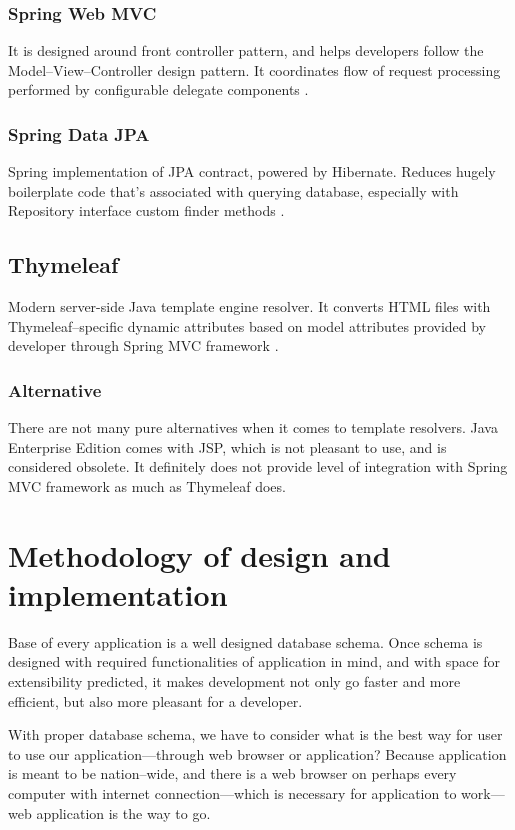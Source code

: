 \documentclass[a4paper,twoside,12pt]{book}
\begin{document}
      \subsubsection{Spring Web MVC}
        It is designed around front controller pattern, and helps developers follow the Model--View--Controller design pattern.
        It coordinates flow of request processing performed by configurable delegate components \cite{bib:spring_web_mvc}.
      
      \subsubsection{Spring Data JPA}
        Spring implementation of JPA contract, powered by Hibernate. Reduces hugely boilerplate code that's associated with querying database,
        especially with Repository interface custom finder methods \cite{bib:spring_data_jpa}.

    \subsection{Thymeleaf}
      Modern server-side Java template engine resolver. 
      It converts HTML files with Thymeleaf--specific dynamic attributes based on model attributes provided by developer through Spring MVC framework \cite{bib:thymeleaf}.
      
      \subsubsection{Alternative}
        There are not many pure alternatives when it comes to template resolvers. 
        Java Enterprise Edition comes with JSP, which is not pleasant to use, and is considered obsolete.
        It definitely does not provide level of integration with Spring MVC framework as much as Thymeleaf does.

  \section{Methodology of design and implementation}
    Base of every application is a well designed database schema. 
    Once schema is designed with required functionalities of application in mind, and with space for extensibility predicted,
    it makes development not only go faster and more efficient, but also more pleasant for a developer.

    With proper database schema, we have to consider what is the best way for user to use our application---through web browser or application?
    Because application is meant to be nation--wide, 
    and there is a web browser on perhaps every computer with internet connection---which is necessary for application to work---web application is the way to go.
    
\end{document}
